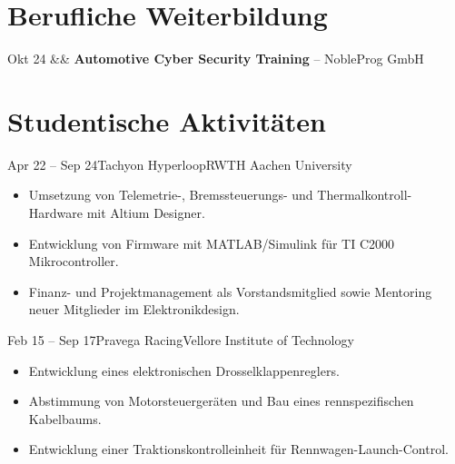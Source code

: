\documentclass[11pt,a4paper,lang=de]{mycv}
\begin{document}
	\begin{skills}
	\end{skills}
	\section{Berufliche Weiterbildung}
	\begin{cvtable}
	Okt 24 && \textbf{\textcolor{cvsecondary}{Automotive Cyber Security Training}} -- NobleProg GmbH
	\end{cvtable}

	\section{Studentische Aktivitäten}
	\begin{experienceentry}{Apr 22 -- Sep 24}{Tachyon Hyperloop}{RWTH Aachen University}
		\vspace{-\baselineskip}
		\begin{itemize}
			\item Umsetzung von Telemetrie-, Bremssteuerungs- und Thermalkontroll-Hardware mit Altium Designer.
			\item Entwicklung von Firmware mit MATLAB/Simulink für TI C2000 Mikrocontroller.
			\item Finanz- und Projektmanagement als Vorstandsmitglied sowie Mentoring neuer Mitglieder im Elektronikdesign.
		\end{itemize}
	\end{experienceentry}
	\begin{experienceentry}{Feb 15 -- Sep 17}{Pravega Racing}{Vellore Institute of Technology}
		\vspace{-\baselineskip}
		\begin{itemize}
			\item Entwicklung eines elektronischen Drosselklappenreglers.
			\item Abstimmung von Motorsteuergeräten und Bau eines rennspezifischen Kabelbaums.
			\item Entwicklung einer Traktionskontrolleinheit für Rennwagen-Launch-Control.
		\end{itemize}
	\end{experienceentry}
	
\end{document}
